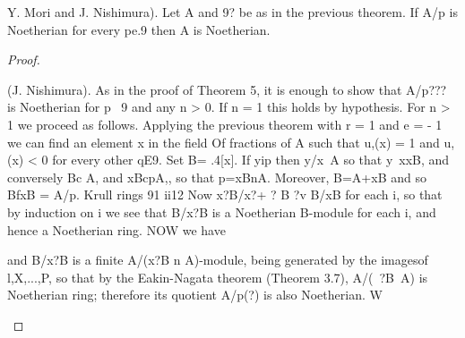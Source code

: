 \begin{theorem}[Theorem 12.7]\label{mcrt-auto-theorem-12-7}
\begin{mathematicalrecord}
Y. Mori and J. Nishimura).       Let A and 9? be as in the
previous theorem. If A/p is Noetherian        for every pe.9 then A is
Noetherian.
\end{mathematicalrecord}
\end{theorem}
\begin{proof}
\begin{mathematicalrecord}
(J. Nishimura). As in the proof of Theorem 5, it is enough to show
that A/p??? is Noetherian for p ~9 and any n > 0. If n = 1 this holds by
hypothesis. For n > 1 we proceed as follows. Applying the previous
theorem with r = 1 and e = - 1 we can find an element x in the field Of
fractions of A such that u,(x) = 1 and u,(x) < 0 for every other qE9. Set
B= .4[x]. If yip then y/x~A so that y~xxB, and conversely Bc A, and
xBcpA,, so that p=xBnA.       Moreover, B=A+xB        and so
         BfxB = A/p.
Krull rings                                                                   91
ii12
Now x?B/x?+ ? B ?v B/xB for each i, so that by induction on i we see that
B/x?B is a Noetherian B-module for each i, and hence a Noetherian ring.
NOW we have


and B/x?B is a finite A/(x?B n A)-module, being generated by the imagesof
l,X,...,P,     so that by the Eakin-Nagata theorem (Theorem 3.7),
A/(~?B~A)    is Noetherian ring; therefore its quotient A/p(?) is also
Noetherian. W
\end{mathematicalrecord}
\end{proof}


